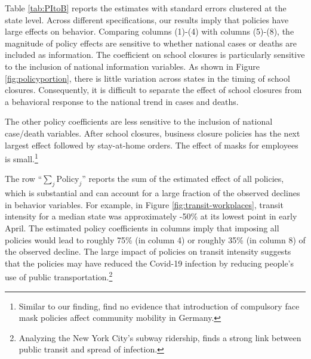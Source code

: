 \documentclass[11pt,reqno,letter]{amsart}
\theoremstyle{definition}
\begin{document}
Table \ref{tab:PItoB} reports the estimates  with standard errors clustered at the state level.  Across different
specifications, our results imply that policies have large effects on
behavior. Comparing columns (1)-(4) with columns (5)-(8),
the magnitude of policy effects are sensitive to whether national
cases or deaths are included as information. The coefficient on school
closures is particularly sensitive to the inclusion of national
information variables.  As shown in Figure
\ref{fig:policyportion}, there is little variation across states in
the timing of school closures. Consequently, it is difficult to
separate the effect of school closures from a behavioral response to the national
trend in cases and deaths.

The other policy coefficients are less sensitive to the inclusion of
national case/death variables. After school closures, business closure policies has the next largest effect followed by stay-at-home
orders.  The effect of masks for employees is
small.\footnote{Similar to our finding, \cite{kovacs2020} find no evidence that introduction of compulsory face mask policies affect community mobility in Germany.}




The row ``$\sum_j \mathrm{Policy}_j$'' reports the sum of the estimated
effect of all policies, which is substantial and can account for a
large fraction of the observed declines in behavior variables.  For
example,  in Figure \ref{fig:transit-workplaces}, transit intensity for a median state was approximately -50\% at its lowest point
 in early April. The estimated policy coefficients in columns imply
that imposing all policies would lead to roughly 75\% (in column
4) or roughly 35\% (in column 8) of the observed decline. The large impact of policies on transit intensity suggests that the policies may have reduced the Covid-19 infection by reducing people's use of public transportation.\footnote{Analyzing the New York City's subway ridership,  \cite{NBERw27021} finds  a strong link between public transit and spread of infection.}


\end{document}
